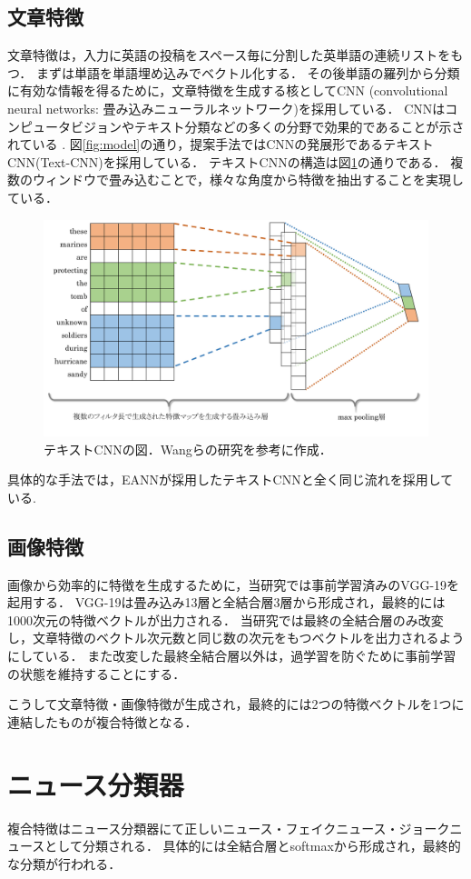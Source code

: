 \subsection{文章特徴}
文章特徴は，入力に英語の投稿をスペース毎に分割した英単語の連続リストをもつ．
まずは単語を単語埋め込みでベクトル化する．
その後単語の羅列から分類に有効な情報を得るために，文章特徴を生成する核としてCNN
(convolutional neural networks: 畳み込みニューラルネットワーク)を採用している．
CNNはコンピュータビジョンやテキスト分類などの多くの分野で効果的であることが示されている
\cite{collobert2011natural,kalchbrenner2014convolutional}.
図\ref{fig:model}の通り，提案手法ではCNNの発展形であるテキストCNN(Text-CNN)\cite{kim2014convolutional}を採用している．
テキストCNNの構造は図\ref{fig:text-cnn}の通りである．
複数のウィンドウで畳み込むことで，様々な角度から特徴を抽出することを実現している．
\begin{figure}[H]
    \centering
    \includegraphics[width=\linewidth]{images/text-cnn.pdf}
    \caption{テキストCNNの図．Wangらの研究\cite{wang2018eann}を参考に作成．}
    \label{fig:text-cnn}
\end{figure}

具体的な手法では，EANNが採用したテキストCNNと全く同じ流れを採用している\cite{wang2018eann}.
%
\subsection{画像特徴}
画像から効率的に特徴を生成するために，当研究では事前学習済みのVGG-19\cite{simonyan2014very}を起用する．
VGG-19は畳み込み13層と全結合層3層から形成され，最終的には1000次元の特徴ベクトルが出力される．
当研究では最終の全結合層のみ改変し，文章特徴のベクトル次元数と同じ数の次元をもつベクトルを出力されるようにしている．
また改変した最終全結合層以外は，過学習を防ぐために事前学習の状態を維持することにする．

こうして文章特徴・画像特徴が生成され，最終的には2つの特徴ベクトルを1つに連結したものが複合特徴となる．
%
\section{ニュース分類器}
%
複合特徴はニュース分類器にて正しいニュース・フェイクニュース・ジョークニュースとして分類される．
具体的には全結合層とsoftmaxから形成され，最終的な分類が行われる．




%
%
\newpage
%
%
%
%
%
%
%
%
%
%
% 